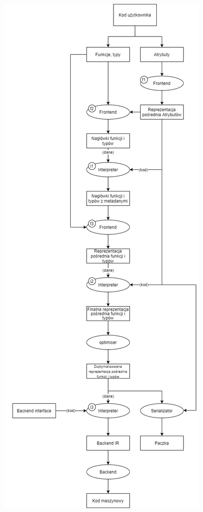 \begin{figure}[]
  \includegraphics[width=\textwidth,height=\textheight,keepaspectratio]{img/compilation_process.png}
  \centering
\end{figure}

